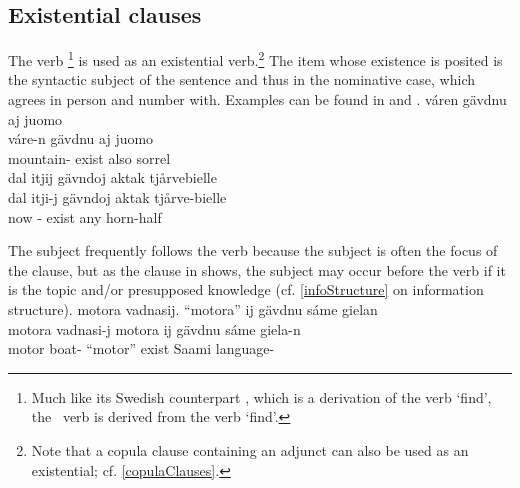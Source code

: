 \subsection{Existential clauses}\label{existentialClauses}
The verb \footnote{Much like its Swedish counterpart %
, which is a derivation of the verb  ‘find’, the \PS\ verb  is derived from the verb  ‘find’.} 
is used as an existential verb.\footnote{Note that a copula clause containing an adjunct can also be used as an existential; cf. \SEC\ref{copulaClauses}.} 
The item whose existence is posited is the syntactic subject of the sentence and thus in the nominative case, which  agrees in person and number with. 
Examples can be found in  and .%
\ea\label{existential1}
\glll	váren gävdnu aj juomo\\
	váre-n gävdnu aj juomo\\
	mountain- exist\BS{} also sorrel\BS{}\\\nopagebreak
{} 
\z
\ea\label{existential2}
\glll	dal itjij gävndoj aktak tjårvebielle\\
	dal itji-j gävndoj aktak tjårve-bielle\\
	now - exist\BS{} any horn-half\BS{}\\\nopagebreak
{} 
\z
{} 

The subject frequently follows the verb because the subject is often the focus of the clause, but as the clause in  shows, the subject may occur before the verb if it is the topic and/or presupposed knowledge (cf. \SEC\ref{infoStructure} on information structure).
\ea\label{existential3}
\glll	motora vadnasij. “motora” ij gävdnu sáme gielan\\
	motora vadnasi-j motora ij gävdnu sáme giela-n\\
	motor\BS{} boat- “motor” \BS{} exist\BS{} Saami\BS{} language-\\\nopagebreak
{} 
\z


